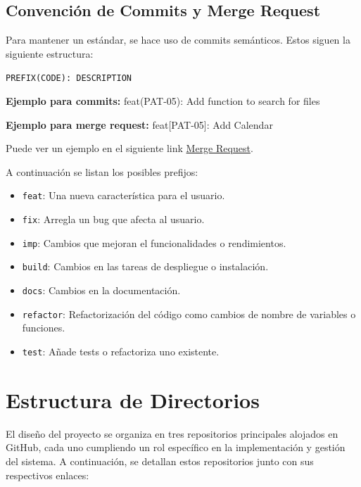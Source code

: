 \subsection{Convención de Commits y Merge Request}

Para mantener un estándar, se hace uso de commits semánticos. Estos siguen la siguiente estructura:

\texttt{PREFIX(CODE): DESCRIPTION}

\textbf{Ejemplo para commits:}
feat(PAT-05): Add function to search for files

\textbf{Ejemplo para merge request:}
feat[PAT-05]: Add Calendar

Puede ver un ejemplo en el siguiente link \href{https://github.com/proyecto-patrocinio/proyecto-patrocinio/pull/100}{Merge Request}.

A continuación se listan los posibles prefijos:

\begin{itemize}
    \item \texttt{feat}: Una nueva característica para el usuario.
    \item \texttt{fix}: Arregla un bug que afecta al usuario.
    \item \texttt{imp}: Cambios que mejoran el funcionalidades o rendimientos.
    \item \texttt{build}: Cambios en las tareas de despliegue o instalación.
    \item \texttt{docs}: Cambios en la documentación.
    \item \texttt{refactor}: Refactorización del código como cambios de nombre de variables o funciones.
    \item \texttt{test}: Añade tests o refactoriza uno existente.
\end{itemize}



\section{Estructura de Directorios}\label{sec:estr-directory}

El diseño del proyecto se organiza en tres repositorios principales alojados en GitHub, cada uno cumpliendo un rol específico en la implementación y gestión del sistema. A continuación, se detallan estos repositorios junto con sus respectivos enlaces:

